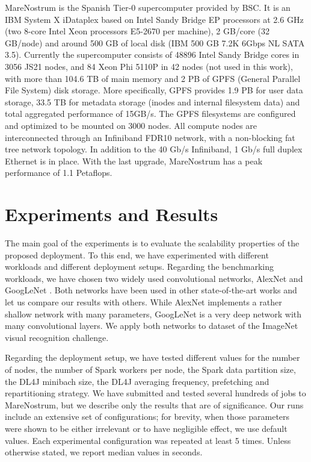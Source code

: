 \documentclass[journal]{IEEEtran}
\begin{document}
MareNostrum is the Spanish Tier-0 supercomputer provided by BSC. It is an IBM System X iDataplex based on Intel Sandy Bridge EP processors at 2.6 GHz (two 8-core Intel Xeon processors E5-2670 per machine), 2 GB/core (32 GB/node) and around 500 GB of local disk (IBM 500 GB  7.2K 6Gbps NL SATA 3.5). Currently the supercomputer consists of 48896 Intel Sandy Bridge cores in 3056 JS21 nodes, and 84 Xeon Phi 5110P in 42 nodes (not used in this work), with more than 104.6 TB of main memory and 2 PB of GPFS (General Parallel File System) disk storage. More specifically, GPFS provides 1.9 PB for user data storage,
33.5 TB for metadata storage (inodes and internal filesystem data) and total aggregated performance of 15GB/s.
The GPFS filesystems are configured and optimized to be mounted on 3000 nodes.
All compute nodes are interconnected through an Infiniband FDR10 network, with a non-blocking fat tree network topology. In addition to the  40 Gb/s Infiniband, 1 Gb/s full duplex Ethernet is in place.
With the last upgrade,  MareNostrum has a peak performance of 1.1 Petaflops.

\section{Experiments and Results}

The main goal of the experiments is to evaluate the scalability properties of the proposed deployment. To this end, we have experimented with different workloads and different deployment setups. Regarding the benchmarking workloads, we have chosen two widely used convolutional networks, AlexNet \cite{DBLP:journals/cacm/KrizhevskySH17} and GoogLeNet \cite{DBLP:conf/cvpr/SzegedyLJSRAEVR15}. Both networks have been used in other state-of-the-art works and let us compare our results with others. While AlexNet implements a rather shallow network with many parameters, GoogLeNet is a very deep network with many convolutional layers. We apply both networks to dataset of the ImageNet \cite{DBLP:journals/ijcv/RussakovskyDSKS15} visual recognition challenge. 

Regarding the deployment setup, we have tested different values for the number of nodes, the number of Spark workers per node, the Spark data partition size, the DL4J minibach size, the DL4J averaging frequency, prefetching and repartitioning strategy. We have submitted and tested several hundreds of jobs to MareNostrum, but we describe only the results that are of significance. Our runs include an extensive set of configurations; for brevity, when those parameters were shown to be either irrelevant or to have negligible effect, we use default values. Each experimental configuration was repeated at least 5 times. Unless otherwise stated, we report median values in seconds. 
\end{document}
